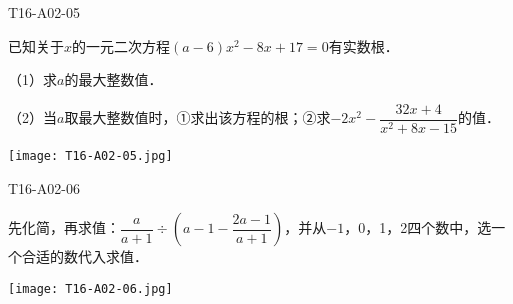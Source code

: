 \begin{defproblem}{T16-A02-05}%
\begin{onlyproblem}%
已知关于$x$的一元二次方程$(a-6)x^{2}-8x+17=0$有实数根．

（1）求$a$的最大整数值．

（2）当$a$取最大整数值时，①求出该方程的根；②求$-2 x^{2}-\dfrac{32x+4}{x^{2}+8x-15}$的值．
\end{onlyproblem}%
\begin{onlysolution}%
\begin{center}
\texttt{[image: T16-A02-05.jpg]}
\end{center}
\end{onlysolution}%
\end{defproblem}


\begin{defproblem}{T16-A02-06}%
\begin{onlyproblem}%
先化简，再求值：$\dfrac{a}{a+1}\div \left(a-1-\dfrac{2a-1}{a+1}\right)$，并从$-1$，0，1，2四个数中，选一个合适的数代入求值．

\end{onlyproblem}%
\begin{onlysolution}%
\begin{center}
\texttt{[image: T16-A02-06.jpg]}
\end{center}
\end{onlysolution}%
\end{defproblem}

